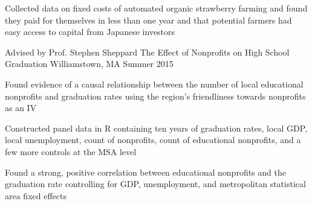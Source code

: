 \begin{cventries}
{\begin{cvitems}
        \item {Collected data on fixed costs of automated organic strawberry farming and found they paid for themselves in less than one year and that potential farmers had easy access to capital from Japanese investors}
      \end{cvitems}
    }
  \cventry
    {Advised by Prof. Stephen Sheppard}
    {The Effect of Nonprofits on High School Graduation}
    {Williamstown, MA}
    {Summer 2015}
    {
      \begin{cvitems}
      \item {Found evidence of a causal relationship between the number of local educational nonprofits and graduation rates using the region's friendliness towards nonprofits as an IV}
      \item {Constructed panel data in R containing ten years of graduation rates, local GDP, local unemployment, count of nonprofits, count of educational nonprofits, and a few more controls at the MSA level}
      \item {Found a strong, positive correlation between educational nonprofits and the graduation rate controlling for GDP, unemployment, and metropolitan statistical area fixed effects}
      \end{cvitems}
      }
\end{cventries}
